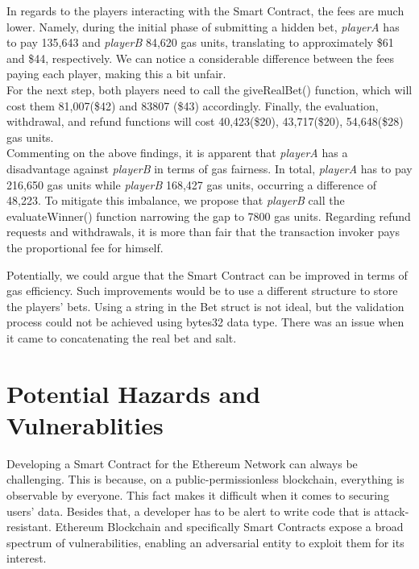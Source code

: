 \documentclass[12pt,a4paper]{article}
\begin{document}
In regards to the players interacting with the Smart Contract, the fees are much lower.
Namely, during the initial phase of submitting a hidden bet, \emph{playerA} has to pay 135,643
and \emph{playerB} 84,620 gas units, translating to approximately \$61 and \$44, respectively.
We can notice a considerable difference between the fees paying each player, making this a bit unfair. \\

For the next step, both players need to call the giveRealBet() function, which will cost
them 81,007(\$42) and  83807 (\$43) accordingly. Finally, the evaluation, withdrawal, and
refund functions will cost 40,423(\$20), 43,717(\$20), 54,648(\$28) gas units.  \\

Commenting on the above findings, it is apparent that \emph{playerA} has a disadvantage against \emph{playerB}
in terms of gas fairness. In total, \emph{playerA} has to pay 216,650 gas units while \emph{playerB} 168,427
gas units, occurring a difference of 48,223. To mitigate this imbalance, we propose that \emph{playerB}
call the evaluateWinner() function narrowing the gap to 7800 gas units. Regarding refund
requests and withdrawals, it is more than fair that the transaction invoker pays the proportional
fee for himself.

Potentially, we could argue that the Smart Contract can be improved in terms of gas efficiency.
Such improvements would be to use a different structure to store the players' bets. Using a string
in the Bet struct is not ideal, but the validation process could not be achieved using bytes32 data type.
There was an issue when it came to concatenating the real bet and salt.

\section*{Potential Hazards and Vulnerablities}

Developing a Smart Contract for the Ethereum Network can always be challenging.
This is because, on a public-permissionless blockchain, everything is observable by everyone.
This fact makes it difficult when it comes to securing users' data. Besides that, a developer
has to be alert to write code that is attack-resistant. Ethereum Blockchain and specifically
Smart Contracts expose a broad spectrum of vulnerabilities, enabling an adversarial entity to
exploit them for its interest. \\
\end{document}
